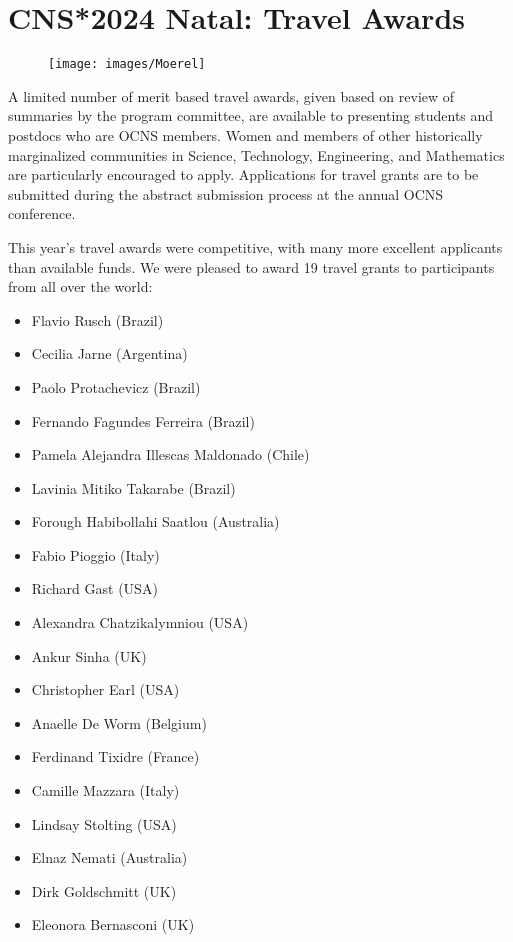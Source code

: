 \section*{CNS*2024 Natal: Travel Awards}%
\begin{wrapfigure}[8]{r}{0.2\textwidth}
  \texttt{[image: images/Moerel]}
\end{wrapfigure}

\noindent{}A limited number of merit based travel awards, given based on review of summaries by the program committee, are available to presenting students and postdocs who are OCNS members. Women and members of other historically marginalized communities in Science, Technology, Engineering, and Mathematics are particularly encouraged to apply.
Applications for travel grants are to be submitted during the abstract submission process at the annual OCNS conference.

This year's travel awards were competitive, with many more excellent applicants than available funds.
We were pleased to award 19 travel grants to participants from all over the world:

\begin{multicols}{2}
    \begin{itemize}
      \item Flavio Rusch (Brazil)
      \item Cecilia Jarne (Argentina)
      \item Paolo Protachevicz (Brazil)
      \item Fernando Fagundes Ferreira (Brazil)
      \item Pamela Alejandra Illescas Maldonado (Chile)
      \item Lavinia Mitiko Takarabe (Brazil)
      \item Forough Habibollahi Saatlou (Australia)
      \item Fabio Pioggio (Italy)
      \item Richard Gast (USA)
      \item Alexandra Chatzikalymniou (USA)
      \item Ankur Sinha (UK)
      \item Christopher Earl (USA)
      \item Anaelle De Worm (Belgium)
      \item Ferdinand Tixidre (France)
      \item Camille Mazzara (Italy)
      \item Lindsay Stolting (USA)
      \item Elnaz Nemati (Australia)
      \item Dirk Goldschmitt (UK)
      \item Eleonora Bernasconi (UK)
    \end{itemize}
\end{multicols}
\vspace{2ex}
\clearpage
